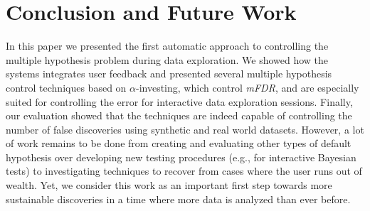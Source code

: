 \section{Conclusion and Future Work}
\label{sec:concl}

In this paper we presented the first automatic approach to controlling the multiple hypothesis  problem during data exploration. 
We showed how the \system{} systems integrates user feedback and presented several multiple hypothesis control techniques based on $\alpha$-investing, which control \emph{mFDR}, and are especially suited for controlling the error for interactive data exploration sessions. 
Finally, our evaluation showed that the techniques are indeed capable of controlling the number of false discoveries using synthetic and real world datasets. 
However, a lot of work remains to be done from  creating and evaluating other types of default hypothesis over developing new testing procedures (e.g., for interactive Bayesian tests) to investigating techniques to recover from cases where the user runs out of wealth. 
Yet, we consider this work as an important first step towards more sustainable discoveries in a time where more data is analyzed than ever before. 


